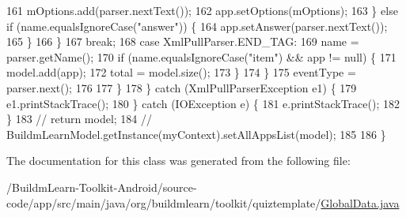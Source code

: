 \begin{DoxyCode}
161                                 mOptions.add(parser.nextText());
162                                 app.setOptions(mOptions);
163                             \} \textcolor{keywordflow}{else} \textcolor{keywordflow}{if} (name.equalsIgnoreCase(\textcolor{stringliteral}{"answer"})) \{
164                                 app.setAnswer(parser.nextText());
165                             \}
166                         \}
167                         \textcolor{keywordflow}{break};
168                     \textcolor{keywordflow}{case} XmlPullParser.END\_TAG:
169                         name = parser.getName();
170                         \textcolor{keywordflow}{if} (name.equalsIgnoreCase(\textcolor{stringliteral}{"item"}) && app != null) \{
171                             model.add(app);
172                             total = model.size();
173                         \}
174                 \}
175                 eventType = parser.next();
176 
177             \}
178         \} \textcolor{keywordflow}{catch} (XmlPullParserException e1) \{
179             e1.printStackTrace();
180         \} \textcolor{keywordflow}{catch} (IOException e) \{
181             e.printStackTrace();
182         \}
183         \textcolor{comment}{// return model;}
184         \textcolor{comment}{// BuildmLearnModel.getInstance(myContext).setAllAppsList(model);}
185 
186     \}
\end{DoxyCode}


The documentation for this class was generated from the following file\-:\begin{DoxyCompactItemize}
\item 
/\-Buildm\-Learn-\/\-Toolkit-\/\-Android/source-\/code/app/src/main/java/org/buildmlearn/toolkit/quiztemplate/\hyperlink{quiztemplate_2GlobalData_8java}{Global\-Data.\-java}\end{DoxyCompactItemize}
